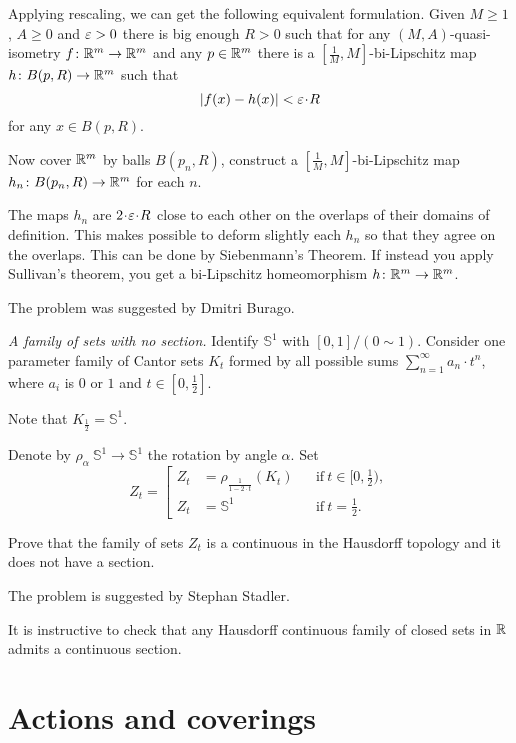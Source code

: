 Applying rescaling, we can get the following equivalent formulation. 
Given $M\ge 1$, $A\ge 0$ and $\varepsilon>0$
there is big enough $R>0$ such that for any $(M,A)$-quasi-isometry 
$f\colon\mathbb{R}^m\to\mathbb{R}^m$ and any $p\in\mathbb{R}^m$ there is a $[\tfrac1M,M]$-bi-Lipschitz map $h\colon B(p,R)\to \mathbb{R}^m$
such that 
\[|f(x)-h(x)|<\eps\cdot R\]
for any $x\in B(p,R)$.

Now cover $\mathbb{R}^m$ by balls
$B(p_n,R)$, construct a $[\tfrac1M,M]$-bi-Lipschitz map $h_n\colon B(p_n,R)\to \mathbb{R}^m$ for each $n$.

The maps $h_n$ are $2\cdot \eps\cdot R$ close to each other on the overlaps of their domains of definition.
This makes possible to deform slightly each $h_n$ so that they agree on the overlaps.
This can be done by Siebenmann's Theorem.
If instead you apply Sullivan's theorem, you get a bi-Lipschitz homeomorphism $h\colon\mathbb{R}^m\to\mathbb{R}^m$.


The problem was suggested by Dmitri Burago.





\textit{A family of sets with no section.}
Identify $\mathbb{S}^1$ with $[0,1]/(0\sim 1)$.
Consider one parameter family of Cantor sets $K_t$
formed by all possible sums $\sum_{n=1}^\infty a_n\cdot t^n$,
where $a_i$ is $0$ or $1$ and $t\in[0,\tfrac12]$.

Note that $K_{\frac12}=\mathbb{S}^1$.

Denote by $\rho_\alpha\:\mathbb{S}^1\to\mathbb{S}^1$ 
the rotation by angle $\alpha$.
Set 
\[Z_t=\left[\begin{aligned}
             Z_t&=\rho_{\frac1{1-2\cdot t}}(K_t)&&\text{if}\ t\in[0,\tfrac12),
\\
Z_{t}&=\mathbb{S}^1&&\text{if}\ t=\tfrac12.
            \end{aligned}
\right.
\]


Prove that the family of sets $Z_t$
is a continuous in the Hausdorff topology and it does not have a section.

 The problem is suggested by Stephan Stadler.

It is instructive to check that any Hausdorff continuous family of closed sets in $\mathbb{R}$ admits a continuous section.




\section*{Actions and coverings}




